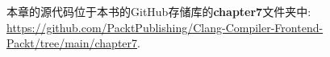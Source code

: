 本章的源代码位于本书的GitHub存储库的\textbf{chapter7}文件夹中: \url{https://github.com/PacktPublishing/Clang-Compiler-Frontend-Packt/tree/main/chapter7}.
